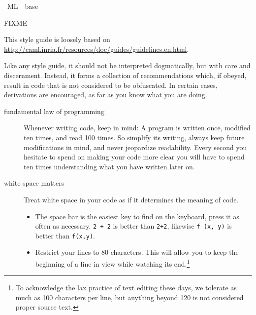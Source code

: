 %
\begin{isabellebody}%
\def\isabellecontext{ML}%
%
\isadelimtheory
\isanewline
\isanewline
%
\endisadelimtheory
%
\isatagtheory
{}\isamarkupfalse%
\ {\isachardoublequoteopen}ML{\isachardoublequoteclose}\ \ base\ %
\endisatagtheory
{\isafoldtheory}%
%
\isadelimtheory
%
\endisadelimtheory
%
\isamarkuptrue%
%
\isamarkuptrue%
%
\begin{isamarkuptext}%
FIXME%
\end{isamarkuptext}%
\isamarkuptrue%
%
\begin{isamarkuptext}%
This style guide is loosely based on
  \url{http://caml.inria.fr/resources/doc/guides/guidelines.en.html}.

  Like any style guide, it should not be interpreted dogmatically, but
  with care and discernment.  Instead, it forms a collection of
  recommendations which, if obeyed, result in code that is not
  considered to be obfuscated.  In certain cases, derivations are
  encouraged, as far as you know what you are doing.

  \begin{description}

    \item[fundamental law of programming]
      Whenever writing code, keep in mind: A program is
      written once, modified ten times, and read
      100 times.  So simplify its writing,
      always keep future modifications in mind,
      and never jeopardize readability.  Every second you hesitate
      to spend on making your code more clear you will
      have to spend ten times understanding what you have
      written later on.

    \item[white space matters]
      Treat white space in your code as if it determines
      the meaning of code.

      \begin{itemize}

        \item The space bar is the easiest key to find on the keyboard,
          press it as often as necessary. \verb|2 + 2| is better
          than \verb|2+2|, likewise \verb|f (x, y)| is
          better than \verb|f(x,y)|.

        \item Restrict your lines to 80 characters.  This will allow
          you to keep the beginning of a line in view while watching
          its end.\footnote{To acknowledge the lax practice of
          text editing these days, we tolerate as much as 100
          characters per line, but anything beyond 120 is not
          considered proper source text.}


\end{itemize}
\end{description}
\end{isamarkuptext}
\end{isabellebody}
